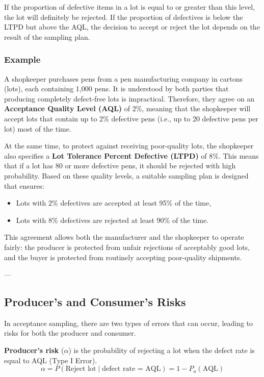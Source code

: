 \documentclass[twoside]{book}
\begin{document}
If the proportion of defective items in a lot is equal to or greater than this level, the lot will definitely be rejected. If the proportion of defectives is below the LTPD but above the AQL, the decision to accept or reject the lot depends on the result of the sampling plan.

\subsubsection*{Example}

A shopkeeper purchases pens from a pen manufacturing company in cartons (lots), each containing 1,000 pens. It is understood by both parties that producing completely defect-free lots is impractical. Therefore, they agree on an \textbf{Acceptance Quality Level (AQL)} of 2\%, meaning that the shopkeeper will accept lots that contain up to 2\% defective pens (i.e., up to 20 defective pens per lot) most of the time.

At the same time, to protect against receiving poor-quality lots, the shopkeeper also specifies a \textbf{Lot Tolerance Percent Defective (LTPD)} of 8\%. This means that if a lot has 80 or more defective pens, it should be rejected with high probability. Based on these quality levels, a suitable sampling plan is designed that ensures:
\begin{itemize}
  \item Lots with 2\% defectives are accepted at least 95\% of the time,
  \item Lots with 8\% defectives are rejected at least 90\% of the time.
\end{itemize}

This agreement allows both the manufacturer and the shopkeeper to operate fairly: the producer is protected from unfair rejections of acceptably good lots, and the buyer is protected from routinely accepting poor-quality shipments.

---

\subsection{Producer's and Consumer's Risks}

In acceptance sampling, there are two types of errors that can occur, leading to risks for both the producer and consumer.

\begin{textbox}
\textbf{Producer's risk} ($\alpha$) is the probability of rejecting a lot when the defect rate is equal to AQL (Type I Error).
$$\alpha = P(\text{Reject lot} \mid \text{defect rate = AQL}) = 1 - P_a(\text{AQL})$$
\end{textbox}
\end{document}

